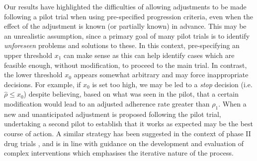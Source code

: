 \documentclass{bmcart}
\begin{document}
Our results have highlighted the difficulties of allowing adjustments to be made following a pilot trial when using pre-specified progression criteria, even when the effect of the adjustment is known (or partially known) in advance. This may be an unrealistic assumption, since a primary goal of many pilot trials is to identify \emph{unforeseen} problems and solutions to these. In this context, pre-specifying an upper threshold $x_1$ can make sense as this can help identify cases which are feasible enough, without modification, to proceed to the main trial. In contrast, the lower threshold $x_0$ appears somewhat arbitrary and may force inappropriate decisions. For example, if $x_0$ is set too high, we may be led to a \emph{stop} decision (i.e. $\hat{\rho} \leq x_0$) despite believing, based on what was seen in the pilot, that a certain modification would lead to an adjusted adherence rate greater than $\rho_1$. When a new and unanticipated adjustment is proposed following the pilot trial, undertaking a second pilot to establish that it works as expected may be the best course of action. A similar strategy has been suggested in the context of phase II drug trials \cite{Brown2012}, and is in line with guidance on the development and evaluation of complex interventions \cite{Skivington2021} which emphasises the iterative nature of the process.


\end{document}
